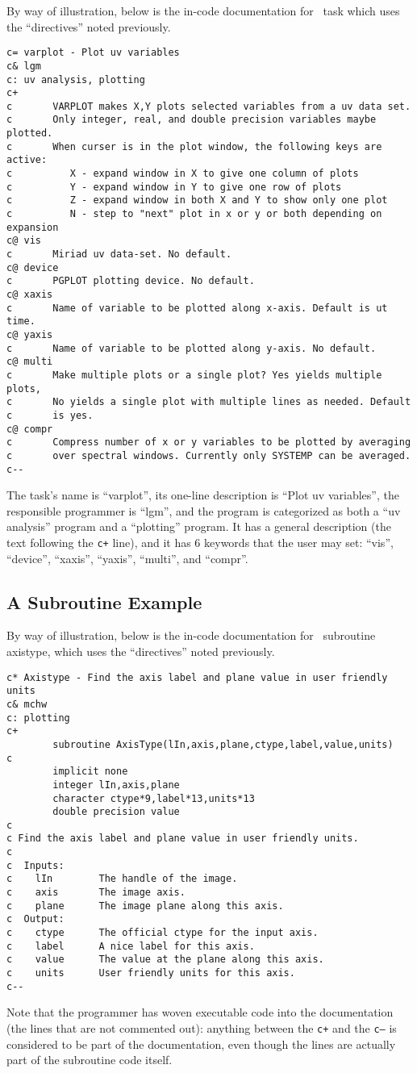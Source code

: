 \documentclass{report}
\begin{document}
By way of illustration, below is the in-code documentation for
\miriad\ task  which uses the ``directives'' noted previously.
{\small\begin{verbatim}
c= varplot - Plot uv variables
c& lgm
c: uv analysis, plotting
c+
c       VARPLOT makes X,Y plots selected variables from a uv data set.
c       Only integer, real, and double precision variables maybe plotted.
c       When curser is in the plot window, the following keys are active:
c          X - expand window in X to give one column of plots
c          Y - expand window in Y to give one row of plots
c          Z - expand window in both X and Y to show only one plot
c          N - step to "next" plot in x or y or both depending on expansion
c@ vis
c       Miriad uv data-set. No default.
c@ device
c       PGPLOT plotting device. No default.
c@ xaxis
c       Name of variable to be plotted along x-axis. Default is ut time.
c@ yaxis
c       Name of variable to be plotted along y-axis. No default.
c@ multi
c       Make multiple plots or a single plot? Yes yields multiple plots,
c       No yields a single plot with multiple lines as needed. Default
c       is yes.
c@ compr
c       Compress number of x or y variables to be plotted by averaging
c       over spectral windows. Currently only SYSTEMP can be averaged.
c--
\end{verbatim}}
The task's name is ``varplot'', its one-line description is ``Plot uv
variables'', the responsible programmer is ``lgm'', and the program is
categorized as both a ``uv analysis'' program and a ``plotting'' program.
It has a general description (the text following the {\tt c+} line), and
it has 6 keywords that the user may set:  ``vis'', ``device'',
``xaxis'', ``yaxis'', ``multi'',
and ``compr''.

\subsection*{A Subroutine Example}

By way of illustration, below is the in-code documentation for
\miriad\ subroutine axistype, which uses the ``directives'' noted previously.
{\small\begin{verbatim}
c* Axistype - Find the axis label and plane value in user friendly units
c& mchw
c: plotting
c+
        subroutine AxisType(lIn,axis,plane,ctype,label,value,units)
c
        implicit none
        integer lIn,axis,plane
        character ctype*9,label*13,units*13
        double precision value
c
c Find the axis label and plane value in user friendly units.
c
c  Inputs:
c    lIn        The handle of the image.
c    axis       The image axis.
c    plane      The image plane along this axis.
c  Output:
c    ctype      The official ctype for the input axis.
c    label      A nice label for this axis.
c    value      The value at the plane along this axis.
c    units      User friendly units for this axis.
c--
\end{verbatim}}
Note that the programmer has woven executable code into the documentation
(the lines that are not commented out):  anything between the {\tt c+} and
the {\tt c--} is considered to be part of the documentation, even though
the lines are actually part of the subroutine code itself.
\end{document}
